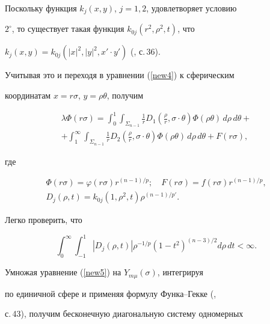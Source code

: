 Поскольку функция $k_j(x,y)$, $j=1,2$, удовлетворяет условию


$2^\circ$, то существует такая функция $k_{0j}(r^2,\rho^2,t)$, что


$k_j(x,y)=k_{0j}(|x|^2,|y|^2,x'\cdot y')$ (\cite{b6}, с.\,36).


Учитывая это и переходя в уравнении (\ref{new4}) к сферическим


координатам $x=r\sigma$, $y=\rho\theta$, получим


\begin{multline}


\lambda\Phi(r\sigma)= \int_0^1 \int_{\Sigma_{n-1}}


\frac1r D_1\left( \frac{\rho}{r}, \sigma\cdot \theta\right)


\Phi(\rho\theta)\,d\rho\, d\theta+ \\


%


+\int_1^\infty \int_{\Sigma_{n-1}}


\frac1r D_2\left( \frac{\rho}{r}, \sigma\cdot \theta\right)


\Phi(\rho\theta)\,d\rho\, d\theta+F(r\sigma),\label{new5}


\end{multline}


где


\begin{gather*}


\Phi(r\sigma)=\varphi(r\sigma) r^{(n-1)/p}; \quad


F(r\sigma)=f(r\sigma) r^{(n-1)/p}, \\


%


D_j(\rho,t)= k_{0j} (1,\rho^2,t) \rho^{(n-1)/p'}.


\end{gather*}


Легко проверить, что


\begin{equation}\label{new7*}


\int_0^\infty \int_{-1}^1


|D_j(\rho,t)|\rho^{-1/p}(1-t^2)^{(n-3)/2}d\rho\,dt<\infty.


\end{equation}


Умножая уравнение (\ref{new5}) на $Y_{m\mu}(\sigma)$, интегрируя


по единичной сфере и применяя формулу Функа--Гекке (\cite{b6},


с.\,43), получим бесконечную диагональную систему одномерных


